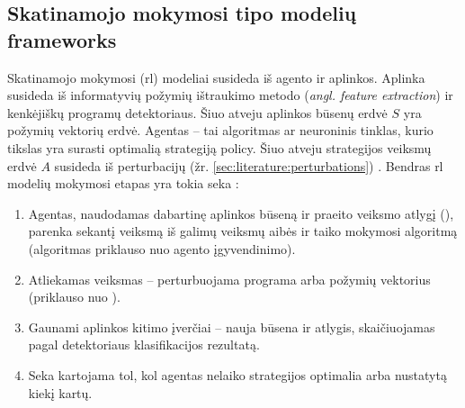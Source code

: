 \subsection{Skatinamojo mokymosi tipo modelių \glspl{framework}}\label{sec:literature:rl}

Skatinamojo mokymosi (\acs{rl}) modeliai susideda iš agento ir aplinkos.
Aplinka susideda iš informatyvių požymių ištraukimo metodo (\textit{angl.
    feature extraction}) ir kenkėjiškų programų detektoriaus. Šiuo atveju aplinkos
būsenų erdvė $S$ yra požymių vektorių erdvė. Agentas -- tai algoritmas ar
neuroninis tinklas, kurio tikslas yra surasti optimalią strategiją
\gls{policy}. Šiuo atveju strategijos veiksmų erdvė $A$ susideda iš
perturbacijų (žr. \ref{sec:literature:perturbations})
\cite{fangEvadingMalwareEngines2019}. Bendras \ac{rl} modelių mokymosi etapas
yra tokia seka \cite{fangEvadingMalwareEngines2019,
    zhongReinforcementLearningBased2022}:
\begin{enumerate}
    \item Agentas, naudodamas dabartinę aplinkos būseną ir praeito veiksmo atlygį
          (), parenka sekantį veiksmą iš galimų veiksmų aibės ir taiko
          mokymosi algoritmą (algoritmas priklauso nuo agento įgyvendinimo).
    \item Atliekamas veiksmas -- perturbuojama programa arba požymių vektorius (priklauso
          nuo ).
    \item Gaunami aplinkos kitimo įverčiai -- nauja būsena ir atlygis, skaičiuojamas
          pagal detektoriaus klasifikacijos rezultatą.
    \item Seka kartojama tol, kol agentas nelaiko strategijos optimalia arba nustatytą
          kiekį kartų.
\end{enumerate}

